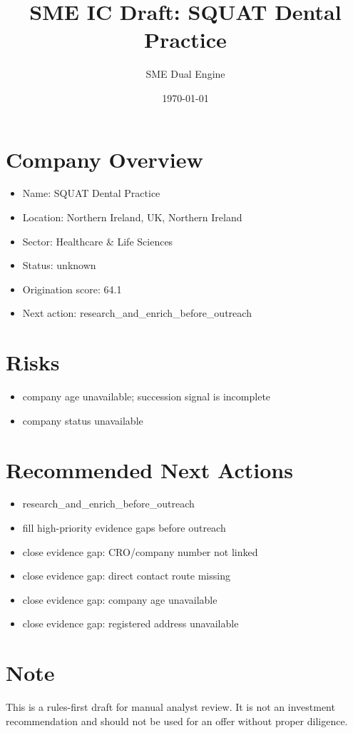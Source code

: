\documentclass[11pt,a4paper]{article}
\title{SME IC Draft: SQUAT Dental Practice}
\author{SME Dual Engine}
\date{\today}
\begin{document}
\maketitle
\section*{Company Overview}
\begin{itemize}[leftmargin=1.4em]
\item Name: SQUAT Dental Practice
\item Location: Northern Ireland, UK, Northern Ireland
\item Sector: Healthcare \& Life Sciences
\item Status: unknown
\item Origination score: 64.1
\item Next action: research\_and\_enrich\_before\_outreach
\end{itemize}
\section*{Risks}
\begin{itemize}[leftmargin=1.4em]
\item company age unavailable; succession signal is incomplete
\item company status unavailable
\end{itemize}
\section*{Recommended Next Actions}
\begin{itemize}[leftmargin=1.4em]
\item research\_and\_enrich\_before\_outreach
\item fill high-priority evidence gaps before outreach
\item close evidence gap: CRO/company number not linked
\item close evidence gap: direct contact route missing
\item close evidence gap: company age unavailable
\item close evidence gap: registered address unavailable
\end{itemize}
\section*{Note}
This is a rules-first draft for manual analyst review. It is not an investment
recommendation and should not be used for an offer without proper diligence.
\end{document}
